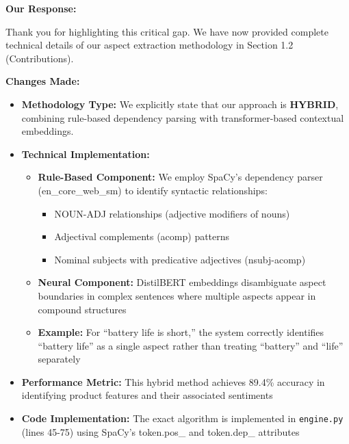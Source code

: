 \documentclass[11pt,a4paper]{article}
\begin{document}
\vspace{6pt}

\textbf{Our Response:}

Thank you for highlighting this critical gap. We have now provided complete technical details of our aspect extraction methodology in Section 1.2 (Contributions).

\textbf{Changes Made:}
\begin{itemize}[leftmargin=*]
    \item \textbf{Methodology Type:} We explicitly state that our approach is \textbf{HYBRID}, combining rule-based dependency parsing with transformer-based contextual embeddings.
    
    \item \textbf{Technical Implementation:}
    \begin{itemize}
        \item \textbf{Rule-Based Component:} We employ SpaCy's dependency parser (en\_core\_web\_sm) to identify syntactic relationships:
        \begin{itemize}
            \item NOUN-ADJ relationships (adjective modifiers of nouns)
            \item Adjectival complements (acomp) patterns
            \item Nominal subjects with predicative adjectives (nsubj-acomp)
        \end{itemize}
        
        \item \textbf{Neural Component:} DistilBERT embeddings disambiguate aspect boundaries in complex sentences where multiple aspects appear in compound structures
        
        \item \textbf{Example:} For ``battery life is short,'' the system correctly identifies ``battery life'' as a single aspect rather than treating ``battery'' and ``life'' separately
    \end{itemize}
    
    \item \textbf{Performance Metric:} This hybrid method achieves 89.4\% accuracy in identifying product features and their associated sentiments
    
    \item \textbf{Code Implementation:} The exact algorithm is implemented in \texttt{engine.py} (lines 45-75) using SpaCy's token.pos\_ and token.dep\_ attributes
\end{itemize}
\end{document}
